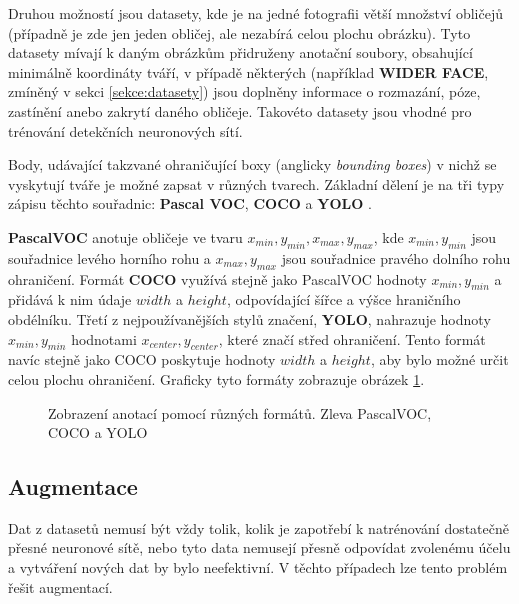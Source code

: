 Druhou možností jsou datasety, kde je na jedné fotografii větší množství obličejů (případně je zde jen jeden obličej, ale nezabírá celou plochu obrázku). Tyto datasety mívají k daným obrázkům přidruženy anotační soubory, obsahující minimálně koordináty tváří, v případě některých (například \textbf{WIDER FACE}, zmíněný v sekci \ref{sekce:datasety}) jsou doplněny informace o rozmazání, póze, zastínění anebo zakrytí daného obličeje. Takovéto datasety jsou vhodné pro trénování detekčních neuronových sítí.

Body, udávající takzvané ohraničující boxy (anglicky \emph{bounding boxes}) v nichž se vyskytují tváře je možné zapsat v různých tvarech. Základní dělení je na tři typy zápisu těchto souřadnic: \textbf{Pascal VOC}, \textbf{COCO} a \textbf{YOLO} \cite{annotace_formaty}.

\textbf{PascalVOC} anotuje obličeje ve tvaru $x_{min}, y_{min}, x_{max}, y_{max}$, kde $x_{min}, y_{min}$ jsou souřadnice levého horního rohu a $x_{max}, y_{max}$ jsou souřadnice pravého dolního rohu ohraničení. Formát \textbf{COCO} využívá stejně jako PascalVOC hodnoty $x_{min}, y_{min}$ a přidává k nim údaje $width$ a $height$, odpovídající šířce a výšce hraničního obdélníku. Třetí z nejpoužívanějších stylů značení, \textbf{YOLO}, nahrazuje hodnoty $x_{min}, y_{min}$ hodnotami $x_{center}, y_{center}$, které značí střed ohraničení. Tento formát navíc stejně jako COCO poskytuje hodnoty $width$ a $height$, aby bylo možné určit celou plochu ohraničení. Graficky tyto formáty zobrazuje obrázek \ref{obrazek:annotace_formaty}.

\begin{figure}[H]
  \begin{center}
  \label{obrazek:annotace_formaty}
  \caption{Zobrazení anotací pomocí různých formátů. Zleva PascalVOC, COCO a YOLO}
  \end{center}
\end{figure}
 
\subsection*{Augmentace}
Dat z datasetů nemusí být vždy tolik, kolik je zapotřebí k natrénování dostatečně přesné neuronové sítě, nebo tyto data nemusejí přesně odpovídat zvolenému účelu a vytváření nových dat by bylo neefektivní. V těchto případech lze tento problém řešit augmentací.

